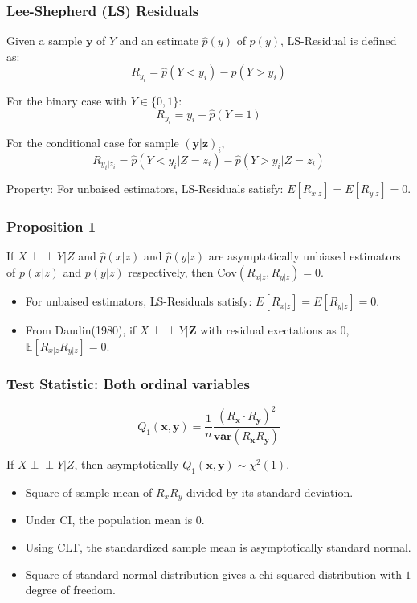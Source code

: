 \documentclass{beamer}
\def\ci{\perp\!\!\!\!\!\perp}
\begin{document}
\begin{frame}
	\frametitle{Lee-Shepherd (LS) Residuals}
	Given a sample $ \bm{y} $ of $ Y $ and an estimate $ \hat{p}(y) $ of $ p(y) $,
	LS-Residual is defined as:
	$$ R_{y_i} = \hat{p}(Y < y_i) - \hat{p}(Y > y_i) $$
	\vspace{1em}

	For the binary case with $ Y \in \{0, 1\} $:
	$$ R_{y_i} = y_i - \hat{p}(Y = 1) $$
	\vspace{1em}

	For the conditional case for sample $ (\bm{y}|\bm{z})_i $,
	$$ R_{y_i | z_i} = \hat{p}(Y < y_i | Z=z_i) - \hat{p}(Y>y_i|Z=z_i) $$

	Property: For unbaised estimators, LS-Residuals satisfy: $ E[R_{x|z}] =
		E[R_{y|z}] = 0 $.
\end{frame}

\begin{frame}
	\frametitle{Proposition 1}
	If $ X \ci Y | Z $ and $ \hat{p}(x|z) $ and $ \hat{p}(y|z) $ are asymptotically
	unbiased estimators of $ p(x|z) $ and $ p(y|z) $ respectively, then 
	$ \mathrm{Cov}(R_{x|z}, R_{y|z}) = 0 $.	
	\vspace{1em}

	\begin{itemize}
		\setlength\itemsep{1em}
		\item For unbaised estimators, LS-Residuals satisfy:
			$ E[R_{x|z}] = E[R_{y|z}] = 0 $.
		\item From Daudin(1980), if $ X \ci Y | \bm{Z} $ with residual exectations
			as $ 0 $, $ \mathbb{E}[R_{x|z} R_{y|z}] = 0 $.
	\end{itemize}
\end{frame}

\begin{frame}
	\frametitle{Test Statistic: Both ordinal variables}
	$$ Q_1(\bm{x}, \bm{y}) = \frac{1}{n} \frac{(R_{\bm{x}} \cdot R_{\bm{y}})^2}{\bm{var}(R_{\bm{x}} R_{\bm{y}})} $$

	If $ X \ci Y | Z $, then asymptotically $ Q_1(\bm{x}, \bm{y}) \sim \chi^2(1) $.

	\begin{itemize}
		\setlength\itemsep{1em}
		\item Square of sample mean of $ R_x R_y $ divided by its
			standard deviation.
		\item Under CI, the population mean is 0.
		\item Using CLT, the standardized sample mean is asymptotically
			standard normal.
		\item Square of standard normal distribution gives a
			chi-squared distribution with $ 1 $ degree of freedom.
	\end{itemize}
\end{frame}
\end{document}

